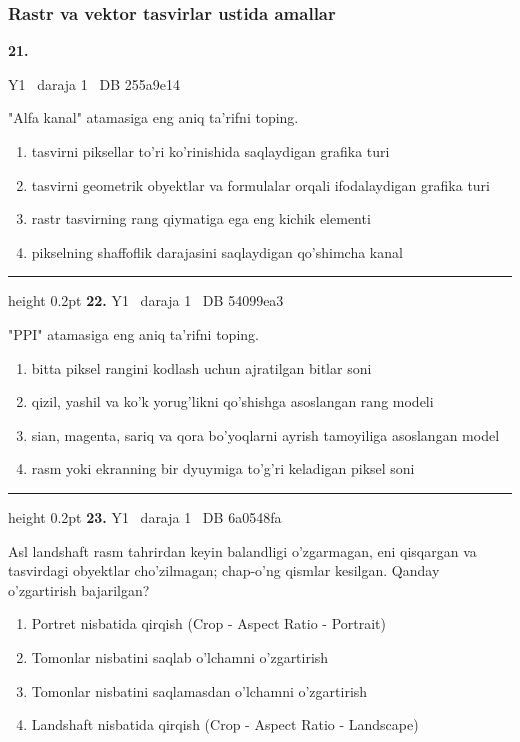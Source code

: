 \documentclass[10pt,a4paper,oneside]{article}
\begin{document}
\subsubsection{Rastr va vektor tasvirlar ustida amallar}
\hypertarget{q21}{\textbf{\color{ink}21.}}  {\color{muted}\scriptsize Y1 \textbullet\ daraja 1 \textbullet\ DB 255a9e14}
\par
"Alfa kanal" atamasiga eng aniq ta'rifni toping.
\begin{enumerate}[label=\Alph*),leftmargin=9mm]
\item tasvirni piksellar to'ri ko'rinishida saqlaydigan grafika turi
\item tasvirni geometrik obyektlar va formulalar orqali ifodalaydigan grafika turi
\item rastr tasvirning rang qiymatiga ega eng kichik elementi
\item pikselning shaffoflik darajasini saqlaydigan qo'shimcha kanal
\end{enumerate}
\vspace{2mm}\hrule height 0.2pt \vspace{4mm}
\hypertarget{q22}{\textbf{\color{ink}22.}}  {\color{muted}\scriptsize Y1 \textbullet\ daraja 1 \textbullet\ DB 54099ea3}
\par
"PPI" atamasiga eng aniq ta'rifni toping.
\begin{enumerate}[label=\Alph*),leftmargin=9mm]
\item bitta piksel rangini kodlash uchun ajratilgan bitlar soni
\item qizil, yashil va ko'k yorug'likni qo'shishga asoslangan rang modeli
\item sian, magenta, sariq va qora bo'yoqlarni ayrish tamoyiliga asoslangan model
\item rasm yoki ekranning bir dyuymiga to'g'ri keladigan piksel soni
\end{enumerate}
\vspace{2mm}\hrule height 0.2pt \vspace{4mm}
\hypertarget{q23}{\textbf{\color{ink}23.}}  {\color{muted}\scriptsize Y1 \textbullet\ daraja 1 \textbullet\ DB 6a0548fa}
\par
Asl landshaft rasm tahrirdan keyin balandligi o'zgarmagan, eni qisqargan va tasvirdagi obyektlar cho'zilmagan; chap-o'ng qismlar kesilgan. Qanday o'zgartirish bajarilgan?
\begin{enumerate}[label=\Alph*),leftmargin=9mm]
\item Portret nisbatida qirqish (Crop - Aspect Ratio - Portrait)
\item Tomonlar nisbatini saqlab o'lchamni o'zgartirish
\item Tomonlar nisbatini saqlamasdan o'lchamni o'zgartirish
\item Landshaft nisbatida qirqish (Crop - Aspect Ratio - Landscape)
\end{enumerate}
\end{document}
